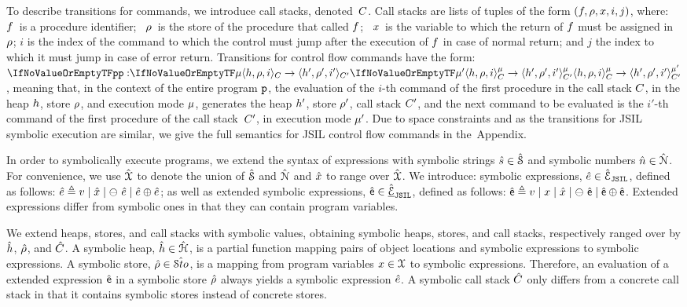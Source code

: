 To describe transitions for \jsil commands, we introduce call stacks, denoted~$C$. Call stacks are lists of tuples of the form $(f, \rho, x, i, j)$, where: 
~$f$~is a procedure identifier;
~$\rho$~is the store of the procedure that called $f$; 
~$x$~is the variable to which the return of $f$ must be assigned in $\rho$; 
 $i$ is the index 
of the command to which the control must jump after the execution of $f$ in 
case of normal return; 
and  $j$ the index to which it must jump in case of 
error return. Transitions for control flow commands have the form:  $\semtrans[\prog][\mode][\mode']{\heap, \store, i}{\heap', \store', i'}[\ctx][\ctx']$, meaning that, in the context of the entire program $\mathtt{p}$, the evaluation of the $i$-th command of the first procedure in the call stack $C$, in
the heap $h$, store $\rho$, and execution mode $\mu$, generates the heap $h'$, store $\rho'$, call stack $C'$,   
and the next command to be evaluated is the $i'$-th command of the first procedure of the call stack~$C'$, in execution mode $\mu'$. Due to space constraints and as the transitions for JSIL symbolic execution are  similar, we give the full semantics for JSIL control flow commands in the~Appendix. %

In order to symbolically execute \jsil programs, we extend the syntax of \jsil expressions with 
symbolic strings $\hat{s} \in \hat{\mathcal{S}}$ and symbolic numbers $\hat{n} \in \hat{\mathcal{N}}$. 
For convenience, we use $\hat{\mathcal{X}}$ to denote the union of $\hat{\mathcal{S}}$ and $\hat{\mathcal{N}}$ 
and $\hat{x}$ to range over $\hat{\mathcal{X}}$. We introduce: \jsil symbolic expressions, $\hat{e} \in \hat{\mathcal{E}}_{\mathtt{JSIL}}$, defined as follows: $\hat{e} \triangleq v \mid \hat{x} \mid \ominus\ \hat{e} \mid \hat{e} \oplus \hat{e}$; as well as \jsil extended symbolic expressions, $\hat{\sf e} \in \underline{\hat{\mathcal{E}}}_{\mathtt{JSIL}}$, defined as follows: $\hat{\sf e} \triangleq v \mid x \mid \hat{x} \mid \ominus\ \hat{\sf e} \mid \hat{\sf e} \oplus \hat{\sf e}$. Extended expressions differ from symbolic ones in that they can contain program variables.

We extend heaps, stores, and call stacks with symbolic values, obtaining symbolic 
heaps, stores, and call stacks, respectively ranged over by $\hat{h}$, $\hat\rho$, and $\hat{C}$. 
A symbolic heap, $\hat{h} \in \hat{\mathcal H}$, is a partial function mapping pairs of  
object locations and symbolic expressions to symbolic expressions. 
A symbolic store, $\hat\rho \in \hat{{\mathcal S}to}$, is a mapping from program variables 
$x \in \mathcal{X}$ to symbolic expressions. Therefore, an evaluation of a \jsil extended expression $\hat{\sf e}$ in a symbolic store $\hat\rho$ always yields a 
symbolic expression $\hat{e}$.
A symbolic call stack $\hat{C}$ only differs from a concrete call stack in that it contains 
symbolic stores instead of concrete stores.
%

